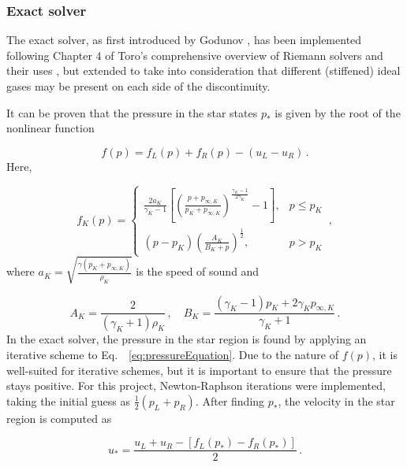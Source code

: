 \documentclass[final,3p,twocolumn,times]{elsarticle}
\begin{document}
\subsubsection{Exact solver}
\label{subsubsec:exact}

The exact solver, as first introduced by Godunov \cite{godunov1959difference},
has been implemented following Chapter 4 of Toro's comprehensive overview of
Riemann solvers and their uses \cite{toro2013riemann}, but extended to take
into consideration that different (stiffened) ideal gases may be present on
each side of the discontinuity. 

It can be proven that the pressure in the star states $p_{*}$ is given by
the root of the nonlinear function

\begin{equation}
    f(p) = f_L(p)+f_R(p)- (u_L-u_R) \,.
    \label{eq:pressureEquation}
\end{equation}
%
Here,  

\begin{equation*}
    f_K(p) = 
    \begin{cases}
        \frac{2a_K}{\gamma_K-1} \left[ \left(
            \frac{p+p_{\infty,K}}{p_K+p_{\infty,K}}
        \right)^{\frac{\gamma_K-1}{2\gamma_K}}-1\right], &p\leq p_K \\
        (p-p_K)\left( \frac{A_K}{B_K+p} \right)^{\frac{1}{2}}, &p>p_K
    \end{cases} \,,
\end{equation*}
%
where $a_K = \sqrt{\frac{\gamma(p_K+p_{\infty,K})}{\rho_K}}$ is the speed of
sound and 

\begin{equation*}
    A_K = \frac{2}{(\gamma_K+1)\rho_K} \,, 
    \quad B_K = \frac{(\gamma_K-1)p_K+2\gamma_K p_{\infty, K}}{\gamma_K+1} \,.
\end{equation*}
% 
In the exact solver, the pressure in the star region is found by applying an
iterative scheme to Eq.~ \eqref{eq:pressureEquation}. Due to the nature of
$f(p)$, it is well-suited for iterative schemes, but
it is important to ensure that the pressure stays positive. For this project,
Newton-Raphson iterations were implemented, taking the initial guess as
$\frac{1}{2}(p_L+p_R)$. After finding $p_*$, the velocity in the star region is computed as

\begin{equation}
    u_{*} = \frac{u_L+u_R-[f_L(p_*)-f_R(p_*)]}{2} \,.
    \label{eq:ustar}
\end{equation}
\end{document}

